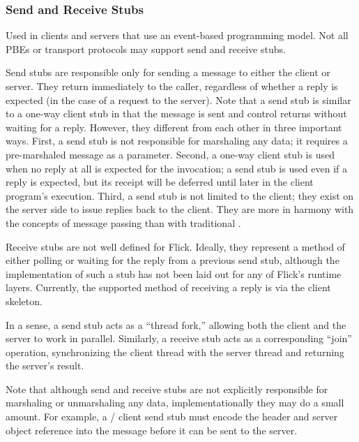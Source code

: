 

\subsubsection{Send and Receive Stubs}

Used in clients and servers that use an event-based programming model.  Not all
PBEs or transport protocols may support send and receive stubs.

Send stubs are responsible only for sending a message to either the client or
server.  They return immediately to the caller, regardless of whether a reply
is expected (in the case of a request to the server).  Note that a send stub is
similar to a one-way client stub in that the message is sent and control
returns without waiting for a reply.  However, they different from each other
in three important ways.  First, a send stub is not responsible for marshaling
any data; it requires a pre-marshaled message as a parameter.  Second, a
one-way client stub is used when no reply at all is expected for the \RPC{}
invocation; a send stub is used even if a reply is expected, but its receipt
will be deferred until later in the client program's execution.  Third, a send
stub is not limited to the client; they exist on the server side to issue
replies back to the client.  They are more in harmony with the concepts of
message passing than with traditional \RPC{}\@.

Receive stubs are not well defined for Flick.  Ideally, they represent a method
of either polling or waiting for the reply from a previous send stub, although
the implementation of such a stub has not been laid out for any of Flick's
runtime layers.  Currently, the supported method of receiving a reply is via
the client skeleton.

In a sense, a send stub acts as a ``thread fork,'' allowing both the client and
the server to work in parallel.  Similarly, a receive stub acts as a
corresponding ``join'' operation, synchronizing the client thread with the
server thread and returning the server's result.

Note that although send and receive stubs are not explicitly responsible for
marshaling or unmarshaling any data, implementationally they may do a small
amount.  For example, a \CORBA{}/\IIOP{} client send stub must encode the
\GIOP{} header and server object reference into the message before it can be
sent to the server.

